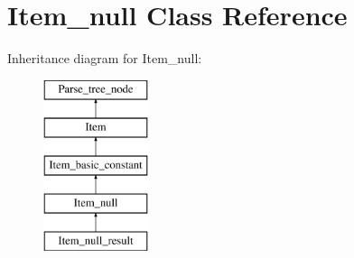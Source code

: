 \hypertarget{classItem__null}{}\section{Item\+\_\+null Class Reference}
\label{classItem__null}
Inheritance diagram for Item\+\_\+null\+:\begin{figure}[H]
\begin{center}
\leavevmode
\includegraphics[height=5.000000cm]{classItem__null}
\end{center}
\end{figure}
